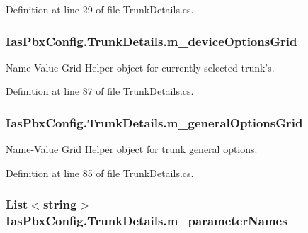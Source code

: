 Definition at line 29 of file TrunkDetails.cs.\hypertarget{class_ias_pbx_config_1_1_trunk_details_a23327d72e0f1d36e063e9e6250956314}{
\subsubsection[{m\_\-deviceOptionsGrid}]{ {\bf IasPbxConfig.TrunkDetails.m\_\-deviceOptionsGrid}}}
\label{class_ias_pbx_config_1_1_trunk_details_a23327d72e0f1d36e063e9e6250956314}


Name-\/Value Grid Helper object for currently selected trunk's. 

Definition at line 87 of file TrunkDetails.cs.\hypertarget{class_ias_pbx_config_1_1_trunk_details_a6cf2a5bbc63dabcbd0e688dff152ae49}{
\subsubsection[{m\_\-generalOptionsGrid}]{ {\bf IasPbxConfig.TrunkDetails.m\_\-generalOptionsGrid}}}
\label{class_ias_pbx_config_1_1_trunk_details_a6cf2a5bbc63dabcbd0e688dff152ae49}


Name-\/Value Grid Helper object for trunk general options. 

Definition at line 85 of file TrunkDetails.cs.\hypertarget{class_ias_pbx_config_1_1_trunk_details_ab128217bd9aa7cdc63636166ed26e961}{
\subsubsection[{m\_\-parameterNames}]{\setlength{\rightskip}{0pt plus 5cm}List$<$string$>$ {\bf IasPbxConfig.TrunkDetails.m\_\-parameterNames}}}
\label{class_ias_pbx_config_1_1_trunk_details_ab128217bd9aa7cdc63636166ed26e961}


